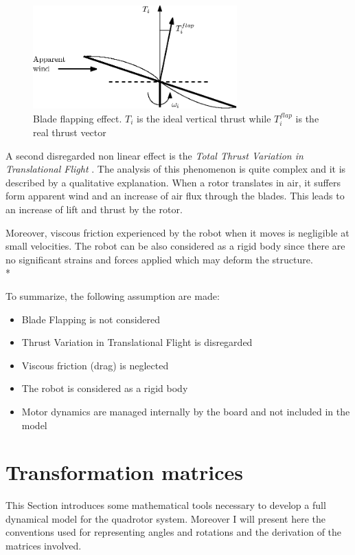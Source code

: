 \begin{figure}[h]
\centering
 \includegraphics[width=0.7\textwidth]{bladeflap.eps}
 \caption[Blade flapping]{Blade flapping effect. $T_i$ is the ideal vertical thrust while $T_i^{flap}$ is the real thrust vector}
 \label{figure:refframes}
\end{figure}
A second disregarded non linear effect is the \textit{Total Thrust Variation in Translational Flight} \cite{Huang2009}. The analysis of this phenomenon is quite complex and it is described by a  qualitative explanation. When a rotor translates in air, it suffers form apparent wind and an increase of air flux through the blades. This leads to an increase of lift and thrust by the rotor.\par
Moreover, viscous friction experienced by the robot when it moves is negligible at small velocities. The robot can be also considered as a rigid body since there are no significant strains and forces applied which may deform the structure. \\*

\noindent
To summarize, the following assumption are made:
\begin{itemize}
\item Blade Flapping is not considered
\item Thrust Variation in Translational Flight is disregarded
\item Viscous friction (drag) is neglected
\item The robot is considered as a rigid body
\item Motor dynamics are managed internally by the board and not included in the model
\end{itemize}

\section{Transformation matrices}
\label{sec:trasfmatrix}
This Section introduces some mathematical tools necessary to develop a full dynamical model for the quadrotor system. Moreover I will present here the conventions used for representing angles and rotations and the derivation of the matrices involved. \\ 

